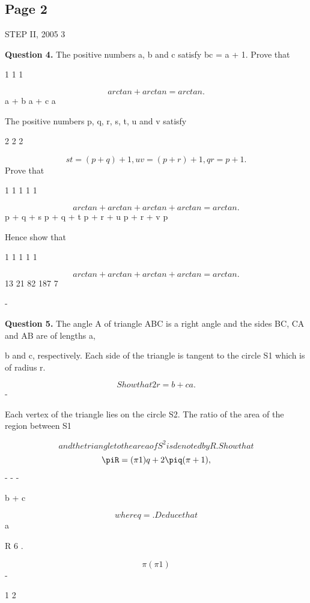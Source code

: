 \documentclass[12pt]{article}
\begin{document}
\subsection*{Page 2}
\begin{flushleft}
STEP II, 2005 3\par
\bigskip\textbf{Question 4.} The positive numbers a, b and c satisfy bc = a + 1. Prove that\par
1 1 1\par
\[arctan + arctan = arctan .\]
a + b a + c a\par
\lambda \mu \lambda \mu \lambda \mu\par
The positive numbers p, q, r, s, t, u and v satisfy\par
2 2 2\par
\[st = (p + q) + 1 , uv = (p + r) + 1 , qr = p + 1 .\]
Prove that\par
1 1 1 1 1\par
\[arctan + arctan + arctan + arctan = arctan .\]
p + q + s p + q + t p + r + u p + r + v p\par
\lambda \mu \lambda \mu \lambda \mu \lambda \mu \lambda \mu\par
Hence show that\par
1 1 1 1 1\par
\[arctan + arctan + arctan + arctan = arctan .\]
13 21 82 187 7\par
\lambda \mu \lambda \mu \lambda \mu \lambda \mu \lambda \mu\par
[ Note that arctan x is another notation for tan x . ]\par
-\par
\bigskip\textbf{Question 5.} The angle A of triangle ABC is a right angle and the sides BC, CA and AB are of lengths a,\par
b and c, respectively. Each side of the triangle is tangent to the circle S1 which is of radius r.\par
\[Show that 2r = b + c a.\]
-\par
Each vertex of the triangle lies on the circle S2. The ratio of the area of the region between S1\par
\[and the triangle to the area of S^2 is denoted by R . Show that\]
\[\piR = (\pi 1)q + 2\piq (\pi + 1) ,\]
- - -\par
b + c\par
\[where q = . Deduce that\]
a\par
R 6 .\par
\[\pi(\pi 1)\]
-\par
1 2\par

\end{flushleft}
\end{document}
